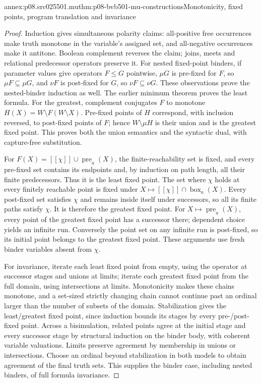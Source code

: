\begin{annexitem}{annex:p08.src025501.mu}{thm:p08-bvb501-mu-constructions}{Monotonicity, fixed points, program translation and invariance}
\begin{proof}
Induction gives simultaneous polarity claims: all-positive free occurrences
make truth monotone in the variable's assigned set, and all-negative
occurrences make it antitone. Boolean complement reverses the claim;
joins, meets and relational predecessor operators preserve it. For
nested fixed-point binders, if parameter values give operators
\(F\leq G\) pointwise, \(\mu G\) is pre-fixed for \(F\),
so \(\mu F\subseteq\mu G\), and \(\nu F\) is post-fixed
for \(G\), so \(\nu F\subseteq\nu G\). These observations
prove the nested-binder induction as well. The earlier minimum theorem
proves the least formula. For the greatest, complement conjugates
\(F\) to monotone \(H(X)=W\setminus F(W\setminus X)\).
Pre-fixed points of \(H\) correspond, with inclusion reversed,
to post-fixed points of \(F\); hence \(W\setminus\mu H\)
is their union and is the greatest fixed point. This proves both the
union semantics and the syntactic dual, with capture-free substitution.

For \(F(X)=[\![\chi]\!]\cup\operatorname{pre}_a(X)\),
the finite-reachability set is fixed, and every pre-fixed set contains
its endpoints and, by induction on path length, all their finite
predecessors. Thus it is the least fixed point. The set where
\(\chi\) holds at every finitely reachable point is fixed under
\(X\mapsto[\![\chi]\!]\cap\operatorname{box}_a(X)\).
Every post-fixed set satisfies \(\chi\) and remains inside itself
under successors, so all its finite paths satisfy \(\chi\).
It is therefore the greatest fixed point. For
\(X\mapsto\operatorname{pre}_a(X)\), every point of the greatest
fixed point has a successor there; dependent choice yields an infinite
run. Conversely the point set on any infinite run is post-fixed, so
its initial point belongs to the greatest fixed point. These arguments
use fresh binder variables absent from \(\chi\).

For invariance, iterate each least fixed point from empty, using the
operator at successor stages and unions at limits; iterate each greatest
fixed point from the full domain, using intersections at limits.
Monotonicity makes these chains monotone, and a set-sized strictly
changing chain cannot continue past an ordinal larger than the number
of subsets of the domain. Stabilization gives the least/greatest fixed
point, since induction bounds its stages by every pre-/post-fixed point.
Across a bisimulation, related points agree at the initial stage and
every successor stage by structural induction on the binder body, with
coherent variable valuations. Limits preserve agreement by membership
in unions or intersections. Choose an ordinal beyond stabilization in
both models to obtain agreement of the final truth sets. This supplies
the binder case, including nested binders, of full formula invariance.


\end{proof}
\end{annexitem}
